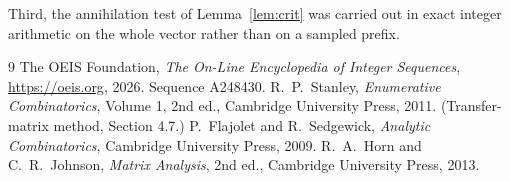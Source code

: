 \documentclass[11pt,a4paper]{article}
\theoremstyle{plain}
\theoremstyle{definition}
\begin{document}
Third, the annihilation test of Lemma~\ref{lem:crit} was carried out in exact integer
arithmetic on the whole vector rather than on a sampled prefix.

\begin{thebibliography}{9}
 The OEIS Foundation, \emph{The On-Line Encyclopedia of Integer
Sequences}, \url{https://oeis.org}, 2026. Sequence A248430.
 R.~P.~Stanley, \emph{Enumerative Combinatorics}, Volume 1, 2nd ed.,
Cambridge University Press, 2011. (Transfer-matrix method, Section 4.7.)
 P.~Flajolet and R.~Sedgewick, \emph{Analytic Combinatorics}, Cambridge
University Press, 2009.
 R.~A.~Horn and C.~R.~Johnson, \emph{Matrix Analysis}, 2nd ed., Cambridge
University Press, 2013.
\end{thebibliography}
\end{document}
